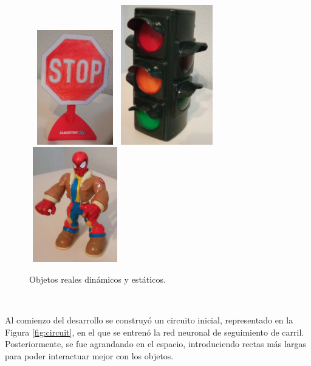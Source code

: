 \begin{figure} [h!]
	\begin{center}
		\includegraphics[width=4cm, height=5cm]{figs/realstopsign}\hspace{0.5cm}\includegraphics[width=4cm]{figs/realtrafficlight}\hspace{0.5cm}\includegraphics[width=4cm, height=5cm]{figs/realpedestrian}
	\end{center}
	\caption{Objetos reales dinámicos y estáticos.}
	\label{fig:objects}
\end{figure}\

Al comienzo del desarrollo se construyó un circuito inicial, representado en la Figura \ref{fig:circuit}, en el que se entrenó la red neuronal de seguimiento de carril. Posteriormente, se fue agrandando en el espacio, introduciendo rectas más largas para poder interactuar mejor con los objetos.\\

